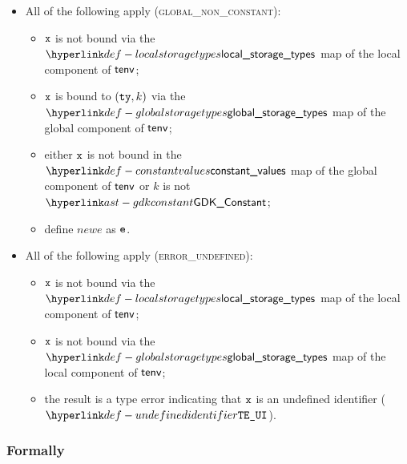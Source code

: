 \begin{itemize}
\begin{itemize}
    \item All of the following apply (\textsc{global\_non\_constant}):
    \begin{itemize}
      \item $\vx$ is not bound via the $\localstoragetypes$ map of the local component of $\tenv$;
      \item $\vx$ is bound to $(\tty, k)$ via the $\globalstoragetypes$ map of the global component of $\tenv$;
      \item either $\vx$ is not bound in the $\constantvalues$ map of the global component of $\tenv$ or $k$ is not $\GDKConstant$;
      \item define $newe$ as $\ve$.
    \end{itemize}

    \item All of the following apply (\textsc{error\_undefined}):
    \begin{itemize}
      \item $\vx$ is not bound via the $\localstoragetypes$ map of the local component of $\tenv$;
      \item $\vx$ is not bound via the $\globalstoragetypes$ map of the local component of $\tenv$;
      \item the result is a type error indicating that $\vx$ is an undefined identifier ($\UndefinedIdentifier$).
    \end{itemize}
  \end{itemize}
\end{itemize}

\subsubsection{Formally}
\begin{mathpar}
\end{mathpar}

\begin{mathpar}
\end{mathpar}

